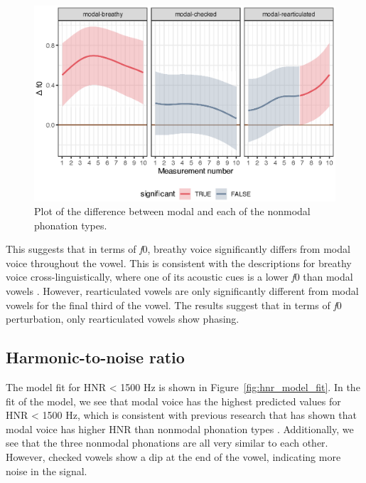 \begin{figure}[h!]
    \centering
    \includegraphics[width = \linewidth]{images/LCH_GAMMs/f0_model_diff.eps}
    \caption{Plot of the difference between modal and each of the nonmodal phonation types.}
    \label{fig:f0_model_diff}
\end{figure}

This suggests that in terms of \textit{f}0, breathy voice significantly differs from modal voice throughout the vowel. This is consistent with the descriptions for breathy voice cross-linguistically, where one of its acoustic cues is a lower \textit{f}0 than modal vowels \citep[e.g.,][]{hillenbrandAcousticCorrelatesBreathy1996}. However, rearticulated vowels are only significantly different from modal vowels for the final third of the vowel. The results suggest that in terms of \textit{f}0 perturbation, only rearticulated vowels show phasing. 
\subsection{Harmonic-to-noise ratio} \label{sec:model_hnr}

The model fit for HNR < 1500 Hz is shown in Figure~\ref{fig:hnr_model_fit}. In the fit of the model, we see that modal voice has the highest predicted values for HNR < 1500 Hz, which is consistent with previous research that has shown that modal voice has higher HNR than nonmodal phonation types \citep[e.g.,][]{blankenshipTimeCourseBreathiness1997,blankenshipTimingNonmodalPhonation2002,dekromCepstrumBasedTechniqueDetermining1993,garellekTimingSequencingCoarticulated2012,garellekPhoneticsVoice2019,gerrattTaxonomyNonmodalPhonation2001}. Additionally, we see that the three nonmodal phonations are all very similar to each other. However, checked vowels show a dip at the end of the vowel, indicating more noise in the signal. 


